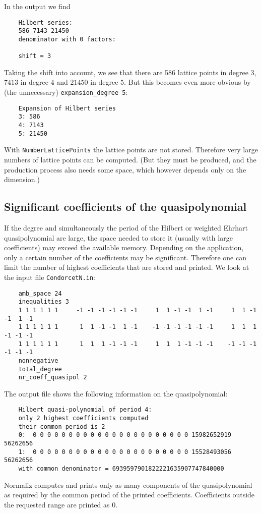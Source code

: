 \documentclass[12pt,a4paper]{scrartcl}
\theoremstyle{definition}
\begin{document}
{	In the output we find
	\begin{Verbatim}
	Hilbert series:
	586 7143 21450 
	denominator with 0 factors:
	
	shift = 3
	\end{Verbatim}
	
	Taking the shift into account, we see that there are 586 lattice points in degree $3$, $7413$ in degree $4$ and $21450$ in degree $5$. But this becomes even more obvious by (the unnecessary) \verb|expansion_degree 5|:
	\begin{Verbatim}
	Expansion of Hilbert series
	3: 586
	4: 7143
	5: 21450
	\end{Verbatim}
	With \verb|NumberLatticePoints| the lattice points are not stored. Therefore very large numbers of lattice points can be computed.  (But they must be produced, and the production process also needs some space, which however depends only on the dimension.)
	
	
	\subsection{Significant coefficients of the quasipolynomial}\label{highest_coeff}
	
	If the degree and simultaneously the period of the Hilbert or weighted Ehrhart quasipolynomial are large, the space needed to store it (usually with large coefficients) may exceed the available memory. Depending on the application, only a certain number of the coefficients may be significant. Therefore one can limit the number of highest coefficients that are stored and printed. We look at the input file \texttt{CondorcetN.in}:
	\begin{Verbatim}
	amb_space 24
	inequalities 3
	1 1 1 1 1 1     -1 -1 -1 -1 -1 -1     1  1 -1 -1  1 -1     1  1 -1 -1  1 -1
	1 1 1 1 1 1      1  1 -1 -1  1 -1    -1 -1 -1 -1 -1 -1     1  1  1 -1 -1 -1
	1 1 1 1 1 1      1  1  1 -1 -1 -1     1  1  1 -1 -1 -1    -1 -1 -1 -1 -1 -1
	nonnegative
	total_degree
	nr_coeff_quasipol 2
	\end{Verbatim}
	
	The output file shows the following information on the quasipolynomial:
	\begin{Verbatim}
	Hilbert quasi-polynomial of period 4:
	only 2 highest coefficients computed
	their common period is 2
	0:  0 0 0 0 0 0 0 0 0 0 0 0 0 0 0 0 0 0 0 0 0 0 15982652919 56262656
	1:  0 0 0 0 0 0 0 0 0 0 0 0 0 0 0 0 0 0 0 0 0 0 15528493056 56262656
	with common denominator = 6939597901822221635907747840000
	\end{Verbatim}
	Normaliz computes and prints only as many components of the quasipolynomial as required by the common period of the printed coefficients. Coefficients outside the requested range are printed as $0$.
	
}
\end{document}
